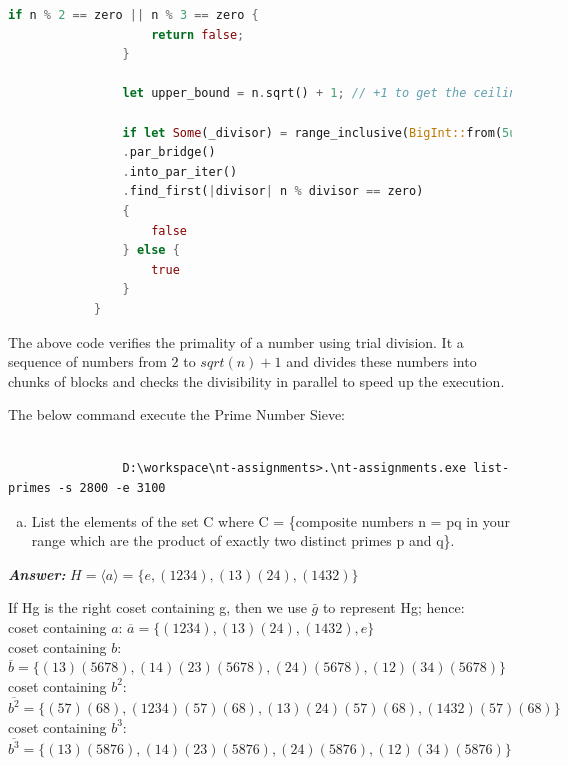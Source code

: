 \documentclass[11pt,a4paper]{article}
\begin{document}
\begin{enumerate}[1.]
\begin{flushleft}
\begin{lstlisting}[language=Rust, basicstyle=\tiny, caption=Prime Number Sieve]
				if n % 2 == zero || n % 3 == zero {
					return false;
				}
				
				let upper_bound = n.sqrt() + 1; // +1 to get the ceiling value
				
				if let Some(_divisor) = range_inclusive(BigInt::from(5u64), upper_bound)
				.par_bridge()
				.into_par_iter()
				.find_first(|divisor| n % divisor == zero)
				{
					false
				} else {
					true
				}
			}

			\end{lstlisting}

			The above code verifies the primality of a number using trial division. It a sequence of numbers from $2$ to $sqrt(n) + 1$ and divides these numbers into chunks of blocks and checks the divisibility in parallel to speed up the execution.
			
			\bigbreak
			The below command execute the Prime Number Sieve:
			\begin{lstlisting}[style=DOS, caption=Example command - Prime Number Sieve]

				D:\workspace\nt-assignments>.\nt-assignments.exe list-primes -s 2800 -e 3100
			\end{lstlisting}
		\end{flushleft}
		
		\begin{enumerate}[(b)]
			\item List the elements of the set C where C = \{composite numbers n = pq in your range which are the product of exactly two distinct primes p and q\}.
		\end{enumerate}
		\begin{flushleft}
			\textbf{\textit{Answer:}} $H = \langle a \rangle = \{e, (1234), (13)(24), (1432)\}$
			
			If Hg is the right coset containing g, then we use $\bar{g}$ to represent Hg; hence: \smallskip \\
			
			coset containing $a$: $\displaystyle\overline{a} = \{(1234),(13)(24),(1432),e\}$ \\
			coset containing $b$: $\displaystyle\overline{b} = \{(13)(5678),(14)(23)(5678),(24)(5678),(12)(34)(5678)\}$ \\
			coset containing $b^2$: $\displaystyle\overline{b^2} = \{(57)(68),(1234)(57)(68),(13)(24)(57)(68),(1432)(57)(68)\}$ \\
			coset containing $b^3$: $\displaystyle\overline{b^3} = \{(13)(5876),(14)(23)(5876),(24)(5876),(12)(34)(5876)\}$ \\
			

\end{flushleft}
\end{enumerate}
\end{document}
